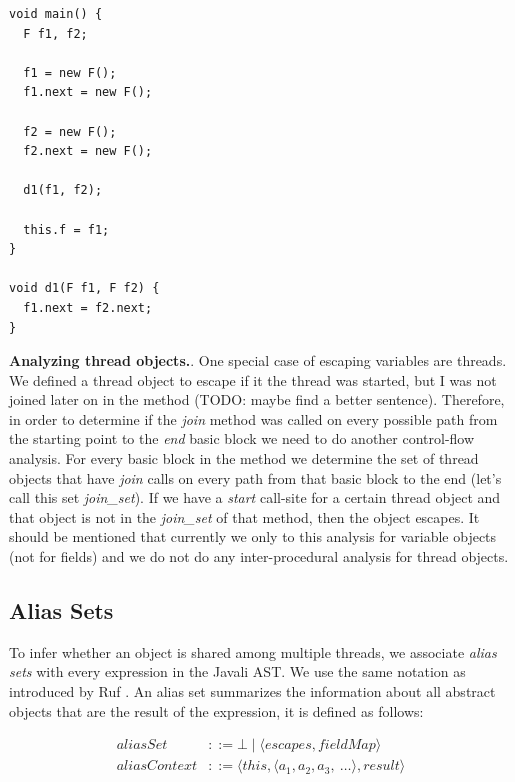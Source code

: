 \documentclass[letterpaper]{article}
\newcommand{\mypar}[1]{{\bf #1.}}
\begin{document}
\begin{lstlisting}[caption=Field parameter assignment, label=lst:fields]
void main() {
  F f1, f2;

  f1 = new F();
  f1.next = new F();

  f2 = new F();
  f2.next = new F();

  d1(f1, f2);

  this.f = f1;
}

void d1(F f1, F f2) {
  f1.next = f2.next;
}
\end{lstlisting}

\mypar{Analyzing thread objects}. One special case of escaping variables are threads. We defined a thread object to escape if
it the thread was started, but I was not joined later on in the method (TODO: maybe find a better sentence).
Therefore, in order to determine if the \textit{join} method was called on every possible path from the starting point
to the \textit{end} basic block we need to do another control-flow analysis. For every basic block in the method we 
determine the set of thread objects that have \textit{join} calls on every path from that basic block to the end (let's call this set \textit{join\_set}).
If we have a \textit{start} call-site for a certain thread object and that object is not in the \textit{join\_set} of that
method, then the object escapes.
It should be mentioned that currently we only to this analysis for variable objects (not for fields) and we do not do any inter-procedural analysis for thread objects.

\subsection{Alias Sets}

To infer whether an object is shared among multiple threads, we associate \emph{alias sets}
with every expression in the Javali AST. We use the same notation as introduced by Ruf \cite{Ruf:00}.
An alias set summarizes the information about all abstract objects that are the result of the expression, it is defined as follows:

\begin{equation*}
\begin{split}
    aliasSet &::= \bot \mid \langle escapes, fieldMap \rangle \\
    aliasContext &::= \langle this, \langle a_{1}, a_{2}, a_{3},~\dots \rangle, result \rangle
\end{split}
\end{equation*}
\end{document}
